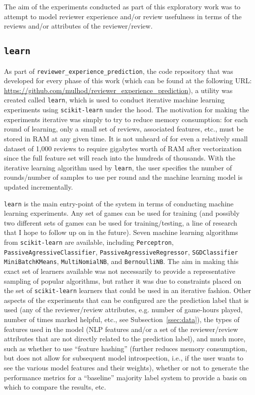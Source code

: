 \documentclass[9pt]{article}
\begin{document}
The aim of the experiments conducted as part of this exploratory work was to attempt to model reviewer experience and/or review usefulness in terms of the reviews and/or attributes of the reviewer/review.

\subsection{{\tt learn}}
\label{ssec:learn}

As part of {\tt reviewer\_experience\_prediction}, the code repository that was developed for every phase of this work (which can be found at the following URL: \url{https://github.com/mulhod/reviewer_experience_prediction}), a utility was created called {\tt learn}, which is used to conduct iterative machine learning experiments using {\tt scikit-learn} under the hood. The motivation for making the experiments iterative was simply to try to reduce memory consumption: for each round of learning, only a small set of reviews, associated features, etc., must be stored in RAM at any given time. It is not unheard of for even a relatively small dataset of 1,000 reviews to require gigabytes worth of RAM after vectorization since the full feature set will reach into the hundreds of thousands. With the iterative learning algorithm used by {\tt learn}, the user specifies the number of rounds/number of samples to use per round and the machine learning model is updated incrementally.

{\tt learn} is the main entry-point of the system in terms of conducting machine learning experiments. Any set of games can be used for training (and possibly two different sets of games can be used for training/testing, a line of research that I hope to follow up on in the future). Seven machine learning algorithms from {\tt scikit-learn} are available, including {\tt Perceptron}, { \tt PassiveAgressiveClassifier}, { \tt PassiveAgressiveRegressor}, {\tt SGDClassifier} {\tt MiniBatchKMeans}, {\tt MultiNomialNB}, and {\tt BernoulliNB}. The aim in making this exact set of learners available was not necessarily to provide a representative sampling of popular algorithms, but rather it was due to constraints placed on the set of {\tt scikit-learn} learners that could be used in an iterative fashion. Other aspects of the experiments that can be configured are the prediction label that is used (any of the reviewer/review attributes, e.g. number of game-hours played, number of times marked helpful, etc., see Subsection~\ref{ssec:data}), the types of features used in the model (NLP features and/or a set of the reviewer/review attributes that are not directly related to the prediction label), and much more, such as whether to use ``feature hashing'' (further reduces memory consumption, but does not allow for subsequent model introspection, i.e., if the user wants to see the various model features and their weights), whether or not to generate the performance metrics for a ``baseline'' majority label system to provide a basis on which to compare the results, etc.
\end{document}
